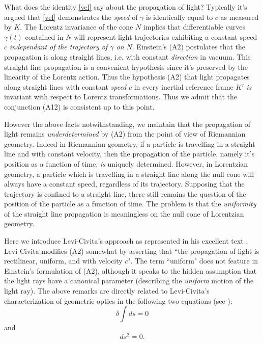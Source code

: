 \documentclass[12pt]{amsart}
\begin{document}
What does the identity \eqref{vel} say about the propagation of light? Typically it's argued that \eqref{vel} demonstrates the \emph{speed} of $\gamma$ is identically equal to $c$ as measured by $K$. The Lorentz invariance of the cone $N$ implies that differentiable curves $\gamma(t)$ contained in $N$ will represent light trajectories exhibiting a constant speed $c$ \emph{independant of the trajectory of $\gamma$ on $N$}. Einstein's (A2) postulates that the propagation is along straight lines, i.e. with constant \emph{direction} in vacuum. This straight line propagation is a convenient hypothesis since it's preserved by the linearity of the Lorentz action. Thus the hypothesis (A2) that light propagates along straight lines with constant \emph{speed} $c$ in every inertial reference frame $K'$ \emph{is} invariant with respect to Lorentz transformations. Thus we admit that the conjunction (A12) is consistent up to this point. 

However the above facts notwithstanding, we maintain that the propagation of light remains \emph{underdetermined} by (A2) from the point of view of Riemannian geometry. Indeed in Riemannian geometry, if a particle is travelling in a straight line and with constant velocity, then the propagation of the particle, namely it's position as a function of time, \emph{is} uniquely determined. However, in Lorentzian geometry, a particle which is travelling in a straight line along the null cone will always have a constant speed, regardless of its trajectory. Supposing that the trajectory is confined to a straight line, there still remains the question of the position of the particle as a function of time. The problem is that the \emph{uniformity} of the straight line propagation is meaningless on the null cone of Lorentzian geometry. 

Here we introduce Levi-Civita's approach as represented in his excellent text \cite{levi}. Levi-Civita modifies (A2) somewhat by asserting that ``the propagation of light is rectilinear, uniform, and with velocity $c$". The term ``uniform" does not feature in Einstein's formulation of (A2), although it speaks to the hidden assumption that the light rays have a canonical parameter (describing the \emph{uniform} motion of the light ray). The above remarks are directly related to Levi-Civita's characterization of geometric optics in the following two equations (see \cite[III.XI.16]{levi}): \begin{equation}
\delta \int ds=0
\label{var}\end{equation}
and
\begin{equation}
ds^2=0.
\end{equation}
\end{document}
